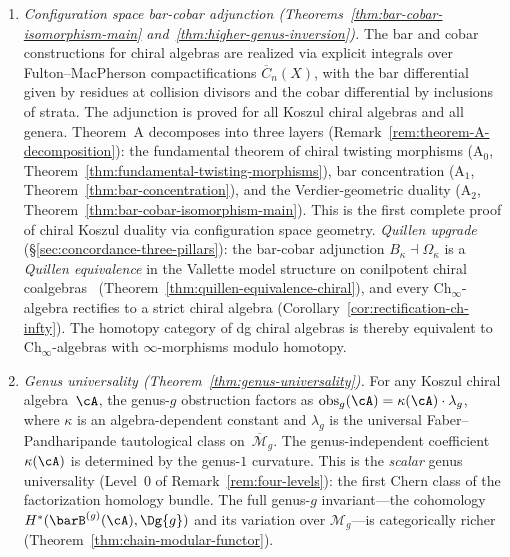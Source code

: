 \begin{enumerate}[label=\emph{(\arabic*)}]

\item \emph{Configuration space bar-cobar adjunction
  (Theorems~\ref{thm:bar-cobar-isomorphism-main}
  and~\ref{thm:higher-genus-inversion}).}
  The bar and cobar constructions for chiral algebras are realized
  via explicit integrals over Fulton--MacPherson compactifications
  $\overline{C}_n(X)$, with the bar differential given by residues
  at collision divisors and the cobar differential by inclusions
  of strata.  The adjunction is proved for all Koszul chiral algebras
  and all genera.  Theorem~A decomposes into three layers
  (Remark~\ref{rem:theorem-A-decomposition}):
  the fundamental theorem of chiral twisting morphisms
  ($\mathrm{A}_0$, Theorem~\ref{thm:fundamental-twisting-morphisms}),
  bar concentration
  ($\mathrm{A}_1$, Theorem~\ref{thm:bar-concentration}), and
  the Verdier-geometric duality
  ($\mathrm{A}_2$, Theorem~\ref{thm:bar-cobar-isomorphism-main}).
  This is the first complete proof of chiral Koszul
  duality via configuration space geometry.
  \emph{Quillen upgrade}
  (\S\ref{sec:concordance-three-pillars}): the bar-cobar adjunction
  $B_\kappa \dashv \Omega_\kappa$ is a \emph{Quillen equivalence}
  in the Vallette model structure on conilpotent
  chiral coalgebras~\cite[Theorem~2.1]{Val16}
  (Theorem~\ref{thm:quillen-equivalence-chiral}),
  and every $\mathrm{Ch}_\infty$-algebra
  rectifies to a strict chiral algebra
  (Corollary~\ref{cor:rectification-ch-infty}).
  The homotopy category of dg chiral algebras is thereby
  equivalent to $\mathrm{Ch}_\infty$-algebras with
  $\infty$-morphisms modulo homotopy.

\item \emph{Genus universality
  (Theorem~\ref{thm:genus-universality}).}
  For any Koszul chiral algebra~$\cA$, the genus-$g$ obstruction
  factors as $\mathrm{obs}_g(\cA) = \kappa(\cA) \cdot \lambda_g$,
  where $\kappa$ is an algebra-dependent constant and $\lambda_g$
  is the universal Faber--Pandharipande tautological class
  on~$\overline{\mathcal{M}}_g$.
  The genus-independent coefficient $\kappa(\cA)$ is determined
  by the genus-$1$ curvature.  This is the \emph{scalar} genus
  universality (Level~$0$ of Remark~\ref{rem:four-levels}): the
  first Chern class of the factorization homology bundle.
  The full genus-$g$ invariant---the cohomology
  $H^*(\barB^{(g)}(\cA), \Dg{g})$ and its variation over
  $\mathcal{M}_g$---is categorically richer
  (Theorem~\ref{thm:chain-modular-functor}).


\end{enumerate}
